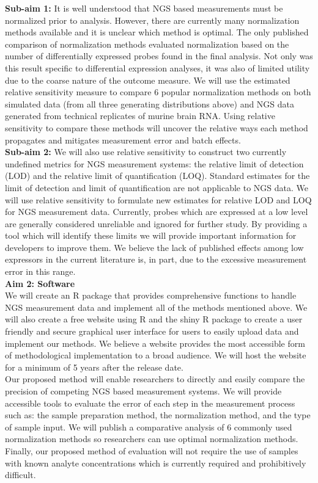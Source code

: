 \documentclass{article}\usepackage[]{graphicx}\usepackage[]{color}
\begin{document}
\textbf{Sub-aim 1:} It is well understood that NGS based measurements must be normalized prior to analysis.  However, there are currently many normalization methods available and it is unclear which method is optimal. The only published comparison of normalization methods evaluated normalization based on the number of differentially expressed probes found in the final analysis. Not only was this result specific to differential expression analyses, it was also of limited utility due to the coarse nature of the outcome measure.  We will use the estimated relative sensitivity measure to compare 6 popular normalization methods on both simulated data (from all three generating distributions above) and NGS data generated from technical replicates of murine brain RNA.  Using relative sensitivity to compare these methods will uncover the relative ways each method propagates and mitigates measurement error and batch effects.\\

\textbf{Sub-aim 2:} We will also use relative sensitivity to construct two currently undefined metrics for NGS measurement systems: the relative limit of detection (LOD) and the relative limit of quantification (LOQ).  Standard estimates for the limit of detection and limit of quantification are not applicable to NGS data.  We will use relative sensitivity to formulate new estimates for relative LOD and LOQ for NGS measurement data.  Currently, probes which are expressed at a low level are generally considered unreliable and ignored for further study. By providing a tool which will identify these limits we will provide important information for developers to improve them.  We believe the lack of published effects among low expressors in the current literature is, in part, due to the excessive measurement error in this range.\\

\textbf{Aim 2: Software}\\
We will create an R package that provides comprehensive functions to handle NGS measurement data and implement all of the methods mentioned above.  We will also create a free website using R and the shiny R package to create a user friendly and secure  graphical user interface for users to easily upload data and implement our methods.  We believe a website provides the most accessible form of methodological implementation to a broad audience.  We will host the website for a minimum of 5 years after the release date. \\

Our proposed method will enable researchers to directly and easily compare the precision of competing NGS based measurement systems. We will provide accessible tools to evaluate the error of each step in the measurement process such as: the sample preparation method, the normalization method, and the type of sample input. We will publish a comparative analysis of 6 commonly used normalization methods so researchers can use optimal normalization methods.  Finally, our proposed method of evaluation will not require the use of samples with known analyte concentrations which is currently required and prohibitively difficult. 
\end{document}
